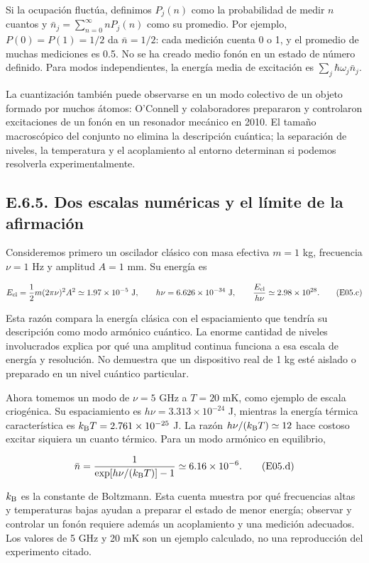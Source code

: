 \documentclass[
  spanish,
  10pt,
  a4paper,
]{article}
\begin{document}
Si la ocupación fluctúa, definimos \(P_j(n)\) como la probabilidad de
medir \(n\) cuantos y \(\bar n_j=\sum_{n=0}^\infty nP_j(n)\) como su
promedio. Por ejemplo, \(P(0)=P(1)=1/2\) da \(\bar n=1/2\): cada
medición cuenta 0 o 1, y el promedio de muchas mediciones es 0.5. No se
ha creado medio fonón en un estado de número definido. Para modos
independientes, la energía media de excitación es
\(\sum_j\hbar\omega_j\bar n_j\).

La cuantización también puede observarse en un modo colectivo de un
objeto formado por muchos átomos: O'Connell y colaboradores prepararon y
controlaron excitaciones de un fonón en un resonador mecánico en 2010.
El tamaño macroscópico del conjunto no elimina la descripción cuántica;
la separación de niveles, la temperatura y el acoplamiento al entorno
determinan si podemos resolverla experimentalmente.

\subsection{E.6.5. Dos escalas numéricas y el límite de la
afirmación}\label{e.6.5.-dos-escalas-numuxe9ricas-y-el-luxedmite-de-la-afirmaciuxf3n}

Consideremos primero un oscilador clásico con masa efectiva \(m=1\) kg,
frecuencia \(\nu=1\) Hz y amplitud \(A=1\) mm. Su energía es

\[
E_{\rm cl}=\frac12m(2\pi\nu)^2A^2
\simeq1.97\times10^{-5}\ {\rm J},
\qquad
h\nu=6.626\times10^{-34}\ {\rm J},
\qquad
\frac{E_{\rm cl}}{h\nu}\simeq2.98\times10^{28}.
\tag{E05.c}
\]

Esta razón compara la energía clásica con el espaciamiento que tendría
su descripción como modo armónico cuántico. La enorme cantidad de
niveles involucrados explica por qué una amplitud continua funciona a
esa escala de energía y resolución. No demuestra que un dispositivo real
de 1 kg esté aislado o preparado en un nivel cuántico particular.

Ahora tomemos un modo de \(\nu=5\) GHz a \(T=20\) mK, como ejemplo de
escala criogénica. Su espaciamiento es \(h\nu=3.313\times10^{-24}\) J,
mientras la energía térmica característica es
\(k_{\rm B}T=2.761\times10^{-25}\) J. La razón
\(h\nu/(k_{\rm B}T)\simeq12\) hace costoso excitar siquiera un cuanto
térmico. Para un modo armónico en equilibrio,

\[
\bar n=\frac{1}{\exp[h\nu/(k_{\rm B}T)]-1}
\simeq6.16\times10^{-6}.
\tag{E05.d}
\]

\(k_{\rm B}\) es la constante de Boltzmann. Esta cuenta muestra por qué
frecuencias altas y temperaturas bajas ayudan a preparar el estado de
menor energía; observar y controlar un fonón requiere además un
acoplamiento y una medición adecuados. Los valores de 5 GHz y 20 mK son
un ejemplo calculado, no una reproducción del experimento citado.
\end{document}
